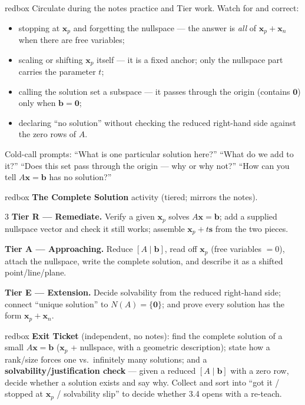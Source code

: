 \documentclass[10pt]{article}
\newcommand{\xx}{\mathbf{x}}
\newcommand{\bb}{\mathbf{b}}
\newcommand{\svec}{\mathbf{s}}
\newcommand{\zero}{\mathbf{0}}
\begin{document}
\begin{skillbox}{redbox}
Circulate during the notes practice and Tier work. Watch for and correct:
\begin{itemize}[leftmargin=1.2em, nosep]
  \item stopping at $\xx_p$ and forgetting the nullspace --- the answer is \emph{all} of $\xx_p+\xx_n$ when there are free variables;
  \item scaling or shifting $\xx_p$ itself --- it is a fixed anchor; only the nullspace part carries the parameter $t$;
  \item calling the solution set a subspace --- it passes through the origin (contains $\zero$) only when $\bb=\zero$;
  \item declaring ``no solution'' without checking the reduced right-hand side against the zero rows of $A$.
\end{itemize}
Cold-call prompts: ``What is one particular solution here?'' ``What do we add to it?'' ``Does this set
pass through the origin --- why or why not?'' ``How can you tell $A\xx=\bb$ has no solution?''
\end{skillbox}

\begin{skillbox}{redbox}
\textbf{The Complete Solution} activity (tiered; mirrors the notes).
\begin{multicols}{3}
\textbf{Tier R --- Remediate.} Verify a given $\xx_p$ solves $A\xx=\bb$; add a supplied nullspace vector
and check it still works; assemble $\xx_p+t\svec$ from the two pieces.

\columnbreak
\textbf{Tier A --- Approaching.} Reduce $[A\mid\bb]$, read off $\xx_p$ (free variables $=0$), attach the
nullspace, write the complete solution, and describe it as a shifted point/line/plane.

\columnbreak
\textbf{Tier E --- Extension.} Decide solvability from the reduced right-hand side; connect ``unique
solution'' to $N(A)=\{\zero\}$; and prove every solution has the form $\xx_p+\xx_n$.
\end{multicols}
\end{skillbox}

\begin{skillbox}{redbox}
\textbf{Exit Ticket} (independent, no notes): find the complete solution of a small $A\xx=\bb$
($\xx_p$ + nullspace, with a geometric description); state how a rank/size forces one vs.\ infinitely
many solutions; and a \textbf{solvability/justification check} --- given a reduced $[A\mid\bb]$ with a
zero row, decide whether a solution exists and say why. Collect and sort into ``got it / stopped at
$\xx_p$ / solvability slip'' to decide whether 3.4 opens with a re-teach.
\end{skillbox}
\end{document}
